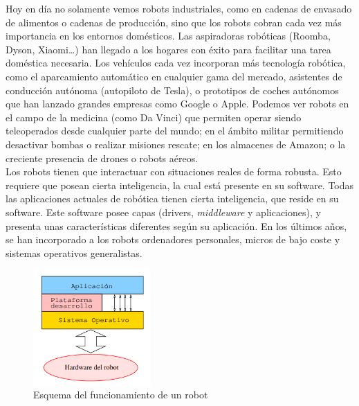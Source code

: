 Hoy en día no solamente vemos robots industriales, como en cadenas de envasado de alimentos o cadenas de producción, sino que los robots cobran cada vez más importancia en los entornos domésticos. Las aspiradoras robóticas (Roomba, Dyson, Xiaomi…) han llegado a los hogares con éxito para facilitar una tarea doméstica necesaria. Los vehículos cada vez incorporan más tecnología robótica, como el aparcamiento automático en cualquier gama del mercado, asistentes de conducción autónoma (autopiloto de Tesla), o prototipos de coches autónomos que han lanzado grandes empresas como Google o Apple. Podemos ver robots en el campo de la medicina (como Da Vinci) que permiten operar siendo teleoperados desde cualquier parte del mundo; en el ámbito militar permitiendo desactivar bombas o realizar misiones rescate; en los almacenes de Amazon; o la creciente presencia de drones o robots aéreos.\\

Los robots tienen que interactuar con situaciones reales de forma robusta. Esto requiere que posean cierta inteligencia, la cual está presente en su software. Todas las aplicaciones actuales de robótica tienen cierta inteligencia, que reside en su software. Este software posee capas (drivers, \textit{middleware} y aplicaciones), y presenta unas características diferentes según su aplicación. En los últimos años, se han incorporado a los robots ordenadores personales, micros de bajo coste y sistemas operativos generalistas.

\begin{figure}[H]
  \begin{center}
    \includegraphics[width=0.4\textwidth]{figures/Introduccion/Esquema_Robot.png}
		\caption{Esquema del funcionamiento de un robot}
		\label{fig.Esquema_Robot}
		\end{center}
\end{figure}


